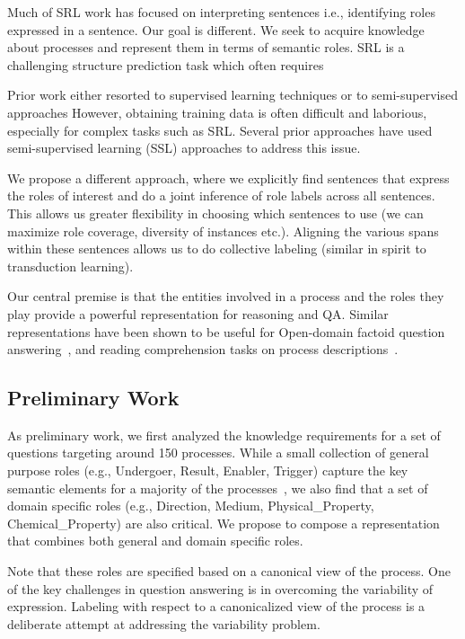 Much of SRL work has focused on interpreting sentences i.e., identifying roles expressed in a sentence.
Our goal is different. 
We seek to acquire knowledge about processes and represent them in terms of semantic roles.
SRL is a challenging structure prediction task which often requires 

Prior work either resorted to supervised learning techniques or to semi-supervised approaches 
However, obtaining training data is often difficult and laborious, especially for complex tasks such as SRL.
Several prior approaches have used semi-supervised learning (SSL) approaches to address this issue. 

We propose a different approach, where we explicitly find sentences that express the roles of interest and do a joint inference of role labels across all sentences. 
This allows us greater flexibility in choosing which sentences to use (we can maximize role coverage, diversity of instances etc.).
Aligning the various spans within these sentences allows us to do collective labeling (similar in spirit to transduction learning).


Our central premise is that the entities involved in a process and the roles they play provide a powerful representation for reasoning and QA. 
Similar representations have been shown to be useful for Open-domain factoid question answering~\cite{shen2007using,pizzato2008indexing}, 
and reading comprehension tasks on process descriptions~\cite{berantSrikumar14}.


\subsection{Preliminary Work}

As preliminary work, we first analyzed the knowledge requirements for a set of questions targeting around 150 processes. 
While a small collection of general purpose roles (e.g., Undergoer, Result, Enabler, Trigger) capture the key semantic elements for a 
majority of the processes~\cite{louvan2015:kcap}, we also find that a set of domain specific roles (e.g., Direction, Medium, Physical\_Property, Chemical\_Property) are also critical. We propose to compose a representation that combines both general and domain specific roles. 

Note that these roles are specified based on a canonical view of the process. One of the key challenges in question answering is in overcoming the variability of expression. Labeling with respect to a canonicalized view of the process is a deliberate attempt at addressing the variability problem. 

